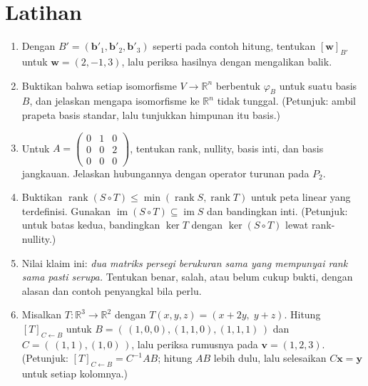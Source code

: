 \section{Latihan}

\begin{latihan}
\begin{enumerate}
  \item Dengan $B'=(\mathbf{b}'_{1},\mathbf{b}'_{2},\mathbf{b}'_{3})$ seperti pada contoh
hitung, tentukan $[\mathbf{w}]_{B'}$ untuk $\mathbf{w}=(2,-1,3)$, lalu periksa hasilnya
        dengan mengalikan balik.

\item Buktikan bahwa setiap isomorfisme $V\to\mathbb{R}^{n}$ berbentuk $\varphi_{B}$ untuk
        suatu basis $B$, dan jelaskan mengapa isomorfisme ke $\mathbb{R}^{n}$ tidak tunggal.
        (Petunjuk: ambil prapeta basis standar, lalu tunjukkan himpunan itu basis.)

  \item Untuk $A=\begin{pmatrix}0&1&0\\ 0&0&2\\ 0&0&0\end{pmatrix}$, tentukan rank, nullity,
        basis inti, dan basis jangkauan. Jelaskan hubungannya dengan operator turunan pada
        $P_{2}$.

\item Buktikan $\operatorname{rank}(S\circ T)\le\min(\operatorname{rank}S,\operatorname{rank}T)$
        untuk peta linear yang terdefinisi. Gunakan
        $\operatorname{im}(S\circ T)\subseteq\operatorname{im}S$ dan bandingkan inti.
        (Petunjuk: untuk batas kedua, bandingkan $\ker T$ dengan $\ker(S\circ T)$ lewat
        rank-nullity.)

\item Nilai klaim ini: \emph{dua matriks persegi berukuran sama yang mempunyai rank sama
pasti serupa.} Tentukan benar, salah, atau belum cukup bukti, dengan alasan dan contoh
        penyangkal bila perlu.

\item Misalkan $T\colon\mathbb{R}^{3}\to\mathbb{R}^{2}$ dengan
        $T(x,y,z)=(x+2y,\;y+z)$. Hitung $[T]_{C\leftarrow B}$ untuk
$B=(\,(1,0,0),(1,1,0),(1,1,1)\,)$ dan $C=(\,(1,1),(1,0)\,)$, lalu periksa rumusnya pada
        $\mathbf{v}=(1,2,3)$.
        (Petunjuk: $[T]_{C\leftarrow B}=C^{-1}AB$; hitung $AB$ lebih dulu, lalu selesaikan
        $C\mathbf{x}=\mathbf{y}$ untuk setiap kolomnya.)


\end{enumerate}
\end{latihan}
